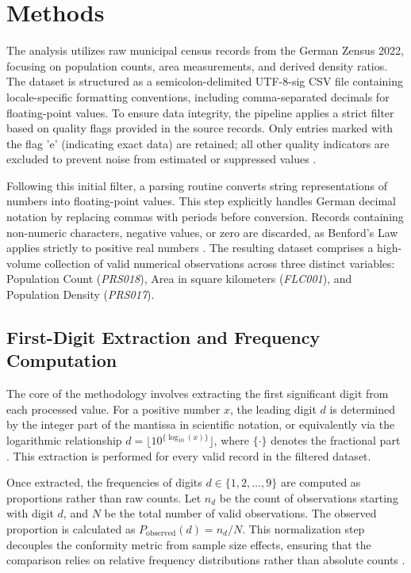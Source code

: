 \documentclass[11pt,a4paper]{article}
\begin{document}
\section{Methods}
The analysis utilizes raw municipal census records from the German Zensus 2022, focusing on population counts, area measurements, and derived density ratios. The dataset is structured as a semicolon-delimited UTF-8-sig CSV file containing locale-specific formatting conventions, including comma-separated decimals for floating-point values. To ensure data integrity, the pipeline applies a strict filter based on quality flags provided in the source records. Only entries marked with the flag 'e' (indicating exact data) are retained; all other quality indicators are excluded to prevent noise from estimated or suppressed values \cite{Durtschi2004TheEU}.

Following this initial filter, a parsing routine converts string representations of numbers into floating-point values. This step explicitly handles German decimal notation by replacing commas with periods before conversion. Records containing non-numeric characters, negative values, or zero are discarded, as Benford's Law applies strictly to positive real numbers \cite{Miller2015BenfordsLT}. The resulting dataset comprises a high-volume collection of valid numerical observations across three distinct variables: Population Count (\textit{PRS018}), Area in square kilometers (\textit{FLC001}), and Population Density (\textit{PRS017}).

\subsection{First-Digit Extraction and Frequency Computation}

The core of the methodology involves extracting the first significant digit from each processed value. For a positive number $x$, the leading digit $d$ is determined by the integer part of the mantissa in scientific notation, or equivalently via the logarithmic relationship $d = \lfloor 10^{\{ \log_{10}(x) \}} \rfloor$, where $\{ \cdot \}$ denotes the fractional part \cite{Kraus2014ADW}. This extraction is performed for every valid record in the filtered dataset.

Once extracted, the frequencies of digits $d \in \{1, 2, \dots, 9\}$ are computed as proportions rather than raw counts. Let $n_d$ be the count of observations starting with digit $d$, and $N$ be the total number of valid observations. The observed proportion is calculated as $P_{\text{observed}}(d) = n_d / N$. This normalization step decouples the conformity metric from sample size effects, ensuring that the comparison relies on relative frequency distributions rather than absolute counts \cite{Kossovsky2021OnTM}.
\end{document}
